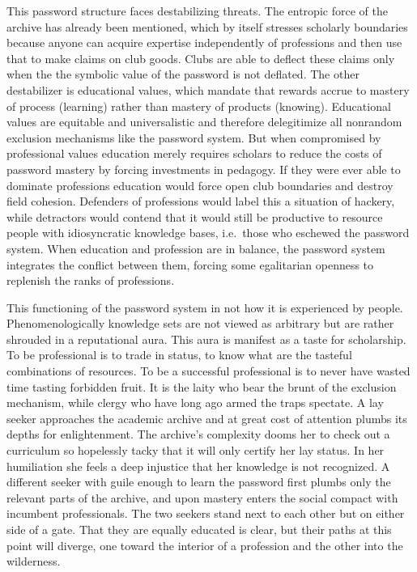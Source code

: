 \documentclass[]{book}
\theoremstyle{definition}
\theoremstyle{definition}
\theoremstyle{definition}
\theoremstyle{remark}
\begin{document}
This password structure faces destabilizing threats. The entropic force
of the archive has already been mentioned, which by itself stresses
scholarly boundaries because anyone can acquire expertise independently
of professions and then use that to make claims on club goods. Clubs are
able to deflect these claims only when the the symbolic value of the
password is not deflated. The other destabilizer is educational values,
which mandate that rewards accrue to mastery of process (learning)
rather than mastery of products (knowing). Educational values are
equitable and universalistic and therefore delegitimize all nonrandom
exclusion mechanisms like the password system. But when compromised by
professional values education merely requires scholars to reduce the
costs of password mastery by forcing investments in pedagogy. If they
were ever able to dominate professions education would force open club
boundaries and destroy field cohesion. Defenders of professions would
label this a situation of hackery, while detractors would contend that
it would still be productive to resource people with idiosyncratic
knowledge bases, i.e.~those who eschewed the password system. When
education and profession are in balance, the password system integrates
the conflict between them, forcing some egalitarian openness to
replenish the ranks of professions.

This functioning of the password system in not how it is experienced by
people. Phenomenologically knowledge sets are not viewed as arbitrary
but are rather shrouded in a reputational aura. This aura is manifest as
a taste for scholarship. To be professional is to trade in status, to
know what are the tasteful combinations of resources. To be a successful
professional is to never have wasted time tasting forbidden fruit. It is
the laity who bear the brunt of the exclusion mechanism, while clergy
who have long ago armed the traps spectate. A lay seeker approaches the
academic archive and at great cost of attention plumbs its depths for
enlightenment. The archive's complexity dooms her to check out a
curriculum so hopelessly tacky that it will only certify her lay status.
In her humiliation she feels a deep injustice that her knowledge is not
recognized. A different seeker with guile enough to learn the password
first plumbs only the relevant parts of the archive, and upon mastery
enters the social compact with incumbent professionals. The two seekers
stand next to each other but on either side of a gate. That they are
equally educated is clear, but their paths at this point will diverge,
one toward the interior of a profession and the other into the
wilderness.
\end{document}
